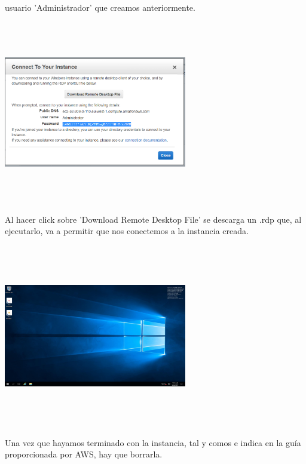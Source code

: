 \documentclass[english,runningheads,a4paper]{llncs}[2018/03/10]
\newenvironment{nscenter}
 {\parskip=0pt\par\nopagebreak\centering}
 {\par\noindent\ignorespacesafterend}
\begin{document}
usuario 'Administrador' que creamos anteriormente. 
\newline
\begin{nscenter}
\includegraphics[width=8cm,height=8cm,keepaspectratio]{./Contenedores/AWS/39.png}
\end{nscenter}
\newline
Al hacer click sobre 'Download Remote Desktop File' se descarga un .rdp que, al 
ejecutarlo, va a permitir que nos conectemos a la instancia creada.
\newline
\begin{nscenter}
\includegraphics[width=8cm,height=8cm,keepaspectratio]{./Contenedores/AWS/41.png}
\end{nscenter}
\newline
Una vez que hayamos terminado con la instancia, tal y comos e indica en la guía 
proporcionada por AWS, hay que borrarla.
\newline
\end{document}
